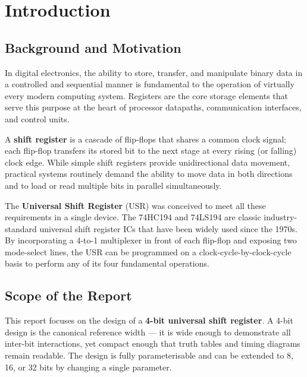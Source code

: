 \documentclass[12pt,a4paper]{report}
\begin{document}
\chapter{Introduction}

\section{Background and Motivation}

In digital electronics, the ability to store, transfer, and manipulate binary data in a controlled and sequential manner is fundamental to the operation of virtually every modern computing system. Registers are the core storage elements that serve this purpose at the heart of processor datapaths, communication interfaces, and control units.

A \textbf{shift register} is a cascade of flip-flops that shares a common clock signal; each flip-flop transfers its stored bit to the next stage at every rising (or falling) clock edge. While simple shift registers provide unidirectional data movement, practical systems routinely demand the ability to move data in both directions and to load or read multiple bits in parallel simultaneously.

The \textbf{Universal Shift Register} (USR) was conceived to meet all these requirements in a single device. The 74HC194 and 74LS194 are classic industry-standard universal shift register ICs that have been widely used since the 1970s. By incorporating a 4-to-1 multiplexer in front of each flip-flop and exposing two mode-select lines, the USR can be programmed on a clock-cycle-by-clock-cycle basis to perform any of its four fundamental operations.

\section{Scope of the Report}

This report focuses on the design of a \textbf{4-bit universal shift register}. A 4-bit design is the canonical reference width — it is wide enough to demonstrate all inter-bit interactions, yet compact enough that truth tables and timing diagrams remain readable. The design is fully parameterisable and can be extended to 8, 16, or 32 bits by changing a single parameter.
\end{document}
